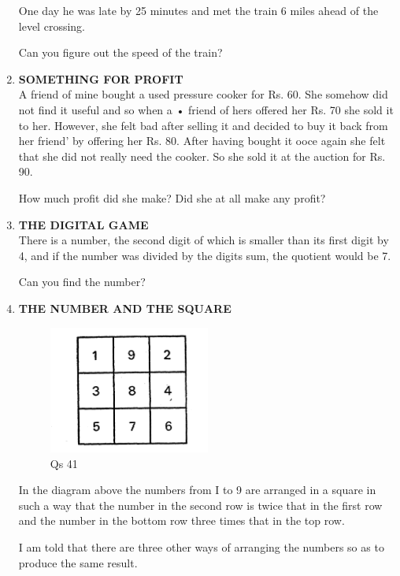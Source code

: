 \documentclass[12pt]{article}
\begin{document}
\begin{enumerate}
One day he was late by 25 minutes  and  met  the  train 6 miles  ahead  of the level  crossing.  

Can  you  figure  out the speed  of the train? 
%
\item \textbf{SOMETHING  FOR  PROFIT} \\
A friend  of mine  bought  a used  pressure  cooker  for Rs. 60. She  somehow  did not find  it useful  and so when a • friend  of hers  offered  her Rs. 70 she sold  it to her. However,  she felt bad after  selling  it and decided  to buy it back  from  her  friend'  by offering  her Rs.  80. After having  bought  it ooce  again  she felt that she did not really need the  cooker.  So  she  sold  it at the  auction  for Rs. 90. 

How  much  profit  did she make?  Did  she  at all make any profit? 
%
\item \textbf{THE  DIGITAL  GAME} \\
There  is a number,  the second  digit  of which  is smaller than its first  digit  by 4, and if the  number  was  divided  by the digits  sum,  the quotient  would  be 7. 

Can you find  the number? 

\item \textbf{THE  NUMBER  AND  THE  SQUARE} \\
\begin{figure}[h]
\begin{center}
\includegraphics[width=0.5\textwidth]{images/sdevi_q41.png}
\caption{ Qs 41}
\end{center}
\end{figure}
In the  diagram  above  the  numbers  from  I to 9 are arranged  in a square  in such  a way  that the number  in the second  row is twice  that in the first  row  and  the  number in the bottom  row  three  times  that  in the top row. 

I am told  that  there  are three  other  ways  of arranging the numbers  so as to produce  the same  result. 


\end{enumerate}
\end{document}
